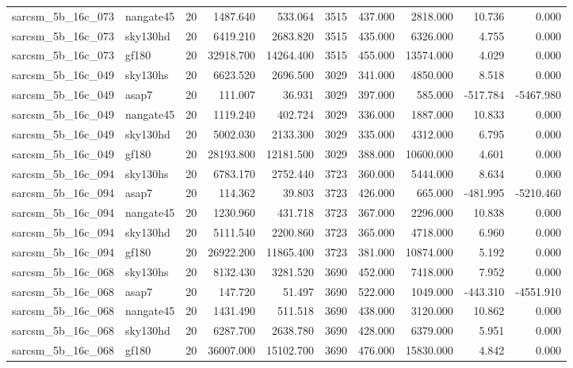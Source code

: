 \begin{tabular}{llrrrrrrrr}
sarcsm\_5b\_16c\_073 & nangate45 & 20 & 1487.640 & 533.064 & 3515 & 437.000 & 2818.000 & 10.736 & 0.000 \\
sarcsm\_5b\_16c\_073 & sky130hd & 20 & 6419.210 & 2683.820 & 3515 & 435.000 & 6326.000 & 4.755 & 0.000 \\
sarcsm\_5b\_16c\_073 & gf180 & 20 & 32918.700 & 14264.400 & 3515 & 455.000 & 13574.000 & 4.029 & 0.000 \\
sarcsm\_5b\_16c\_049 & sky130hs & 20 & 6623.520 & 2696.500 & 3029 & 341.000 & 4850.000 & 8.518 & 0.000 \\
sarcsm\_5b\_16c\_049 & asap7 & 20 & 111.007 & 36.931 & 3029 & 397.000 & 585.000 & -517.784 & -5467.980 \\
sarcsm\_5b\_16c\_049 & nangate45 & 20 & 1119.240 & 402.724 & 3029 & 336.000 & 1887.000 & 10.833 & 0.000 \\
sarcsm\_5b\_16c\_049 & sky130hd & 20 & 5002.030 & 2133.300 & 3029 & 335.000 & 4312.000 & 6.795 & 0.000 \\
sarcsm\_5b\_16c\_049 & gf180 & 20 & 28193.800 & 12181.500 & 3029 & 388.000 & 10600.000 & 4.601 & 0.000 \\
sarcsm\_5b\_16c\_094 & sky130hs & 20 & 6783.170 & 2752.440 & 3723 & 360.000 & 5444.000 & 8.634 & 0.000 \\
sarcsm\_5b\_16c\_094 & asap7 & 20 & 114.362 & 39.803 & 3723 & 426.000 & 665.000 & -481.995 & -5210.460 \\
sarcsm\_5b\_16c\_094 & nangate45 & 20 & 1230.960 & 431.718 & 3723 & 367.000 & 2296.000 & 10.838 & 0.000 \\
sarcsm\_5b\_16c\_094 & sky130hd & 20 & 5111.540 & 2200.860 & 3723 & 365.000 & 4718.000 & 6.960 & 0.000 \\
sarcsm\_5b\_16c\_094 & gf180 & 20 & 26922.200 & 11865.400 & 3723 & 381.000 & 10874.000 & 5.192 & 0.000 \\
sarcsm\_5b\_16c\_068 & sky130hs & 20 & 8132.430 & 3281.520 & 3690 & 452.000 & 7418.000 & 7.952 & 0.000 \\
sarcsm\_5b\_16c\_068 & asap7 & 20 & 147.720 & 51.497 & 3690 & 522.000 & 1049.000 & -443.310 & -4551.910 \\
sarcsm\_5b\_16c\_068 & nangate45 & 20 & 1431.490 & 511.518 & 3690 & 438.000 & 3120.000 & 10.862 & 0.000 \\
sarcsm\_5b\_16c\_068 & sky130hd & 20 & 6287.700 & 2638.780 & 3690 & 428.000 & 6379.000 & 5.951 & 0.000 \\
sarcsm\_5b\_16c\_068 & gf180 & 20 & 36007.000 & 15102.700 & 3690 & 476.000 & 15830.000 & 4.842 & 0.000 \\

\end{tabular}
